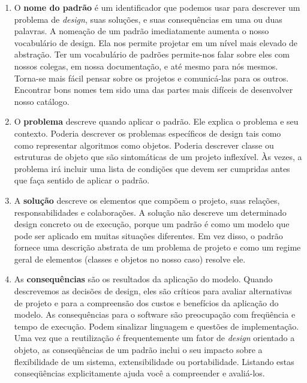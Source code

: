 \begin{enumerate}
	\item 

O \textbf{nome do padrão} é um identificador que podemos usar para descrever um problema de \emph{design}, suas
soluções, e suas consequências em uma ou duas palavras. A nomeação de um padrão imediatamente
aumenta o nosso vocabulário de design. Ela nos permite projetar em um nível mais elevado de
abstração. Ter um vocabulário de padrões permite-nos falar sobre eles com
nossos colegas, em nossa documentação, e até mesmo para nós mesmos. Torna-se
mais fácil pensar sobre os projetos e comunicá-las para os outros. Encontrar bons nomes tem sido uma das partes mais difíceis de desenvolver nosso catálogo.

	\item 


O \textbf{problema} descreve quando aplicar o padrão. Ele explica o problema
e seu contexto. Poderia descrever os problemas específicos de design tais como
como representar algoritmos como objetos. Poderia descrever classe ou
estruturas de objeto que são sintomáticas de um projeto inflexível. Às vezes, a
problema irá incluir uma lista de condições que devem ser cumpridas antes que faça
sentido de aplicar o padrão.


	\item 


A \textbf{solução} descreve os elementos que compõem o projeto, suas
relações, responsabilidades e colaborações. A solução não
descreve um determinado design concreto ou de execução, porque um padrão
é como um modelo que pode ser aplicado em muitas situações diferentes. Em vez disso,
o padrão fornece uma descrição abstrata de um problema de projeto e como
um regime geral de elementos (classes e objetos no nosso caso) resolve
ele.

	\item 


As \textbf{consequências} são os resultados da aplicação do modelo.
Quando descrevemos as decisões de design, eles são críticos para avaliar alternativas de projeto e para a compreensão
dos custos e benefícios da aplicação do modelo. As consequências para o
software são preocupação com freqüência e tempo de execução. Podem sinalizar linguagem
e questões de implementação. Uma vez que a reutilização é frequentemente um fator de
\emph{design} orientado a objeto, as conseqüências de um padrão inclui o seu impacto
sobre a flexibilidade de um sistema, extensibilidade ou portabilidade. Listando estas
conseqüências explicitamente ajuda você a compreender e avaliá-los.


\end{enumerate}

